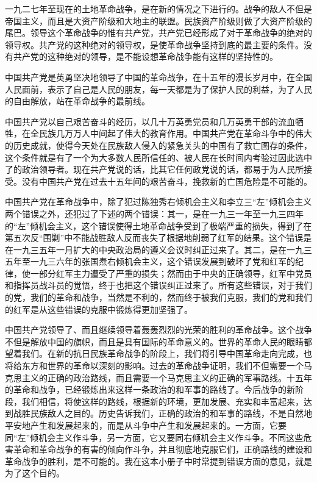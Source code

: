 一九二七年至现在的土地革命战争，是在新的情况之下进行的。战争的敌人不但是帝国主义，而且是大资产阶级和大地主的联盟。民族资产阶级则做了大资产阶级的尾巴。领导这个革命战争的惟有共产党，共产党已经形成了对于革命战争的绝对的领导权。共产党的这种绝对的领导权，是使革命战争坚持到底的最主要的条件。没有共产党的这种绝对的领导，是不能设想革命战争能有这样的坚持性的。

中国共产党是英勇坚决地领导了中国的革命战争，在十五年的漫长岁月中，在全国人民面前，表示了自己是人民的朋友，每一天都是为了保护人民的利益，为了人民的自由解放，站在革命战争的最前线。

中国共产党以自己艰苦奋斗的经历，以几十万英勇党员和几万英勇干部的流血牺牲，在全民族几万万人中间起了伟大的教育作用。中国共产党在革命斗争中的伟大的历史成就，使得今天处在民族敌人侵入的紧急关头的中国有了救亡图存的条件，这个条件就是有了一个为大多数人民所信任的、被人民在长时间内考验过因此选中了的政治领导者。现在共产党说的话，比其它任何政党说的话，都易于为人民所接受。没有中国共产党在过去十五年间的艰苦奋斗，挽救新的亡国危险是不可能的。

中国共产党在革命战争中，除了犯过陈独秀右倾机会主义和李立三“左”倾机会主义两个错误之外，还犯过了下述的两个错误：其一，是在一九三一年至一九三四年的“左”倾机会主义，这个错误使得土地革命战争受到了极端严重的损失，得到了在第五次反“围剿”中不能战胜敌人反而丧失了根据地削弱了红军的结果。这个错误是在一九三五年一月扩大的中央政治局的遵义会议时纠正过来了。其二，是在一九三五年至一九三六年的张国焘右倾机会主义，这个错误发展到破坏了党和红军的纪律，使一部分红军主力遭受了严重的损失；然而由于中央的正确领导，红军中党员和指挥员战斗员的觉悟，终于也把这个错误纠正过来了。所有这些错误，对于我们的党，我们的革命和战争，当然是不利的，然而终于被我们克服，我们的党和我们的红军是从这些错误的克服中锻炼得更加坚强了。

中国共产党领导了、而且继续领导着轰轰烈烈的光荣的胜利的革命战争。这个战争不但是解放中国的旗帜，而且是具有国际的革命意义的。世界的革命人民的眼睛都望着我们。在新的抗日民族革命战争的阶段上，我们将引导中国革命走向完成，也将给东方和世界的革命以深刻的影响。过去的革命战争证明，我们不但需要一个马克思主义的正确的政治路线，而且需要一个马克思主义的正确的军事路线。十五年的革命和战争，已经锻炼出来这样一条政治的和军事的路线了。今后战争的新阶段，我们相信，将使这样的路线，根据新的环境，更加发展、充实和丰富起来，达到战胜民族敌人之目的。历史告诉我们，正确的政治的和军事的路线，不是自然地平安地产生和发展起来的，而是从斗争中产生和发展起来的。一方面，它要同“左”倾机会主义作斗争，另一方面，它又要同右倾机会主义作斗争。不同这些危害革命和革命战争的有害的倾向作斗争，并且彻底地克服它们，正确路线的建设和革命战争的胜利，是不可能的。我在这本小册子中时常提到错误方面的意见，就是为了这个目的。

